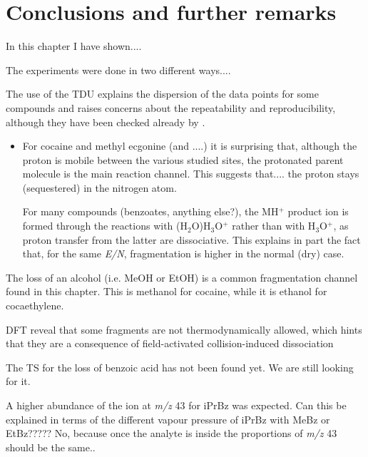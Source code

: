\section{Conclusions and further remarks}
In this chapter I have shown....

The experiments were done in two different ways....

The use of the TDU explains the dispersion of the data points for some compounds and raises concerns about the repeatability  and reproducibility, although they have been checked already by \citeauthor{RN445} \cite{RN445}.


\begin{itemize}
\item For cocaine and methyl ecgonine (and ....) it is surprising that, although the proton is mobile between the various studied sites, the protonated parent molecule is the main reaction channel. 
This suggests that.... the proton stays (sequestered) in the nitrogen atom.


For many compounds (benzoates, anything else?), the MH$^+$ product ion is formed through the reactions with (H$_2$O)H$_3$O$^+$ rather than with H$_3$O$^+$, as proton transfer from the latter are dissociative. This explains in part the fact that, for the same \textit{E/N}, fragmentation is higher in the normal (dry) case.





\end{itemize}


The loss of an alcohol (i.e. MeOH or EtOH) is a common fragmentation channel found in this chapter.
This is methanol for cocaine, while it is ethanol for cocaethylene.

DFT reveal that some fragments are not thermodynamically allowed, which hints that they are a consequence of field-activated collision-induced dissociation

The TS for the loss of benzoic acid has not been found yet. We are still looking for it.


A higher abundance of the ion at \textit{m/z} 43 for iPrBz was expected. Can this be explained in terms of the different vapour pressure of iPrBz with MeBz or EtBz????? No, because once the analyte is inside the proportions of \textit{m/z} 43 should be the same..


